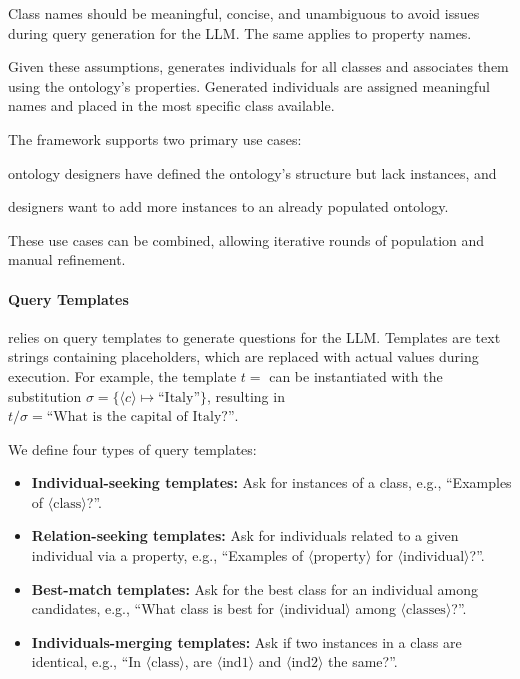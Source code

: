 %
Class names should be meaningful, concise, and unambiguous to avoid issues during query generation for the \gls{LLM}.
%
The same applies to property names.

%
Given these assumptions, \llmfkg{} generates individuals for all classes and associates them using the ontology's properties.
%
Generated individuals are assigned meaningful names and placed in the most specific class available.

%
The framework supports two primary use cases:
%
\begin{inlinelist}
    \item ontology designers have defined the ontology's structure but lack instances, and
    \item designers want to add more instances to an already populated ontology.
\end{inlinelist}
%
These use cases can be combined, allowing iterative rounds of population and manual refinement.

%
\paragraph{Query Templates}
\label{par:query-templates}

\llmfkg{} relies on query templates to generate questions for the \gls{LLM}.
%
Templates are text strings containing placeholders, which are replaced with actual values during execution.
%
For example, the template \(t = \) can be instantiated with the substitution \(\sigma = \{\langle c \rangle \mapsto \text{``Italy''}\}\), resulting in \(t / \sigma = \text{``What is the capital of Italy?''}\).

%
We define four types of query templates:
%
\begin{itemize}
    \item \textbf{Individual-seeking templates:} Ask for instances of a class, e.g., ``Examples of \(\langle \text{class} \rangle\)?''.
    \item \textbf{Relation-seeking templates:} Ask for individuals related to a given individual via a property, e.g., ``Examples of \(\langle \text{property} \rangle\) for \(\langle \text{individual} \rangle\)?''.
    \item \textbf{Best-match templates:} Ask for the best class for an individual among candidates, e.g., ``What class is best for \(\langle \text{individual} \rangle\) among \(\langle \text{classes} \rangle\)?''.
    \item \textbf{Individuals-merging templates:} Ask if two instances in a class are identical, e.g., ``In \(\langle \text{class} \rangle\), are \(\langle \text{ind1} \rangle\) and \(\langle \text{ind2} \rangle\) the same?''.
\end{itemize}

